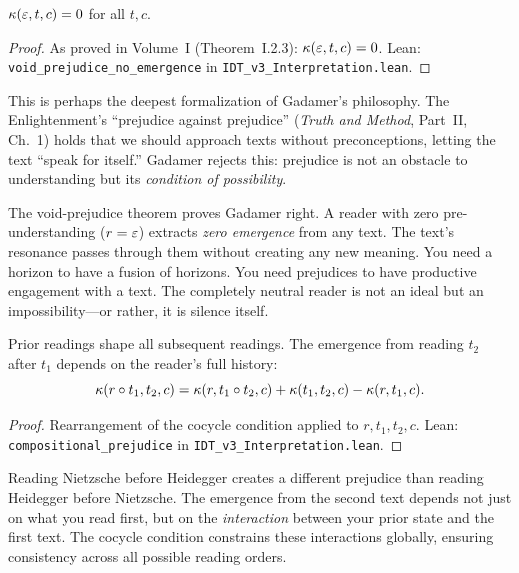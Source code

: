 \begin{theorem}
\label{thm:void-prejudice}
$\kappa(\varepsilon, t, c) = 0$ for all $t, c$.
\end{theorem}

\begin{proof}
As proved in Volume~I (Theorem~I.2.3): $\kappa(\varepsilon, t, c) = 0$.
Lean: \texttt{void\_prejudice\_no\_emergence} in \texttt{IDT\_v3\_Interpretation.lean}.
\end{proof}

\begin{interpretation}
\label{interp:prejudice-rehab}
This is perhaps the deepest formalization of Gadamer's philosophy. The
Enlightenment's ``prejudice against prejudice'' (\textit{Truth and Method},
Part~II, Ch.~1) holds that we should approach texts without preconceptions,
letting the text ``speak for itself.'' Gadamer rejects this: prejudice is
not an obstacle to understanding but its \emph{condition of possibility}.

The void-prejudice theorem proves Gadamer right. A reader with zero
pre-understanding ($r = \varepsilon$) extracts \emph{zero emergence} from any text.
The text's resonance passes through them without creating any new meaning.
You need a horizon to have a fusion of horizons. You need prejudices to have
productive engagement with a text. The completely neutral reader is not an
ideal but an impossibility---or rather, it is silence itself.
\end{interpretation}

\begin{theorem}
\label{thm:compositional-prejudice}
Prior readings shape all subsequent readings. The emergence from reading $t_2$
after $t_1$ depends on the reader's full history:
\[
\kappa(r \circ t_1, t_2, c) =
\kappa(r, t_1 \circ t_2, c) + \kappa(t_1, t_2, c) - \kappa(r, t_1, c).
\]
\end{theorem}

\begin{proof}
Rearrangement of the cocycle condition applied to $r, t_1, t_2, c$.
Lean: \texttt{compositional\_prejudice} in \texttt{IDT\_v3\_Interpretation.lean}.
\end{proof}

\begin{interpretation}
Reading Nietzsche before Heidegger creates a different prejudice than reading
Heidegger before Nietzsche. The emergence from the second text depends not just
on what you read first, but on the \emph{interaction} between your prior state
and the first text. The cocycle condition constrains these interactions globally,
ensuring consistency across all possible reading orders.
\end{interpretation}

